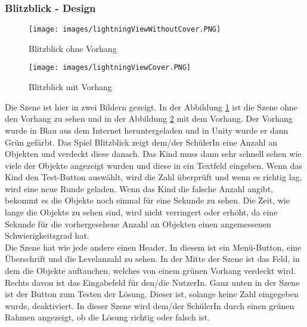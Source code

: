 \subsubsection{Blitzblick - Design}
\begin{figure}[htbp]
  \centering
  \texttt{[image: images/lightningViewWithoutCover.PNG]}
  \caption{Blitzblick ohne Vorhang}
  \label{withoutCover}
\end{figure}
\begin{figure}[htbp]
  \centering
  \texttt{[image: images/lightningViewCover.PNG]}
  \caption{Blitzblick mit Vorhang}
  \label{withCover}
\end{figure}
Die Szene ist hier in zwei Bildern gezeigt. In der Abbildung \ref{withoutCover} ist die Szene ohne den Vorhang zu sehen und in der Abbildung \ref{withCover} mit dem Vorhang. Der Vorhang wurde in Blau aus dem Internet heruntergeladen und in Unity wurde er dann Grün gefärbt\autocite{Vorhang}. Das Spiel Blitzblick zeigt dem/der SchülerIn eine Anzahl an Objekten und verdeckt diese danach. Das Kind muss dann sehr schnell sehen wie viele der Objekte angezeigt wurden und diese in ein Textfeld eingeben. Wenn das Kind den Test-Button auswählt, wird die Zahl überprüft und wenn es richtig lag, wird eine neue Runde geladen. Wenn das Kind die falsche Anzahl angibt, bekommt es die Objekte noch einmal für eine Sekunde zu sehen. Die Zeit, wie lange die Objekte zu sehen sind, wird nicht verringert oder erhöht, da eine Sekunde für die vorhergesehene Anzahl an Objekten einen angemessenen Schwierigkeitsgrad hat.\\
Die Szene hat wie jede andere einen Header. In diesem ist ein Menü-Button, eine Überschrift und die Levelanzahl zu sehen. In der Mitte der Szene ist das Feld, in dem die Objekte auftauchen, welches von einem grünen Vorhang verdeckt wird. Rechts davon ist das Eingabefeld für den/die NutzerIn. Ganz unten in der Szene ist der Button zum Testen der Lösung. Dieser ist, solange keine Zahl eingegeben wurde, deaktiviert. In dieser Szene wird dem/der SchülerIn durch einen grünen Rahmen angezeigt, ob die Lösung richtig oder falsch ist.\\
